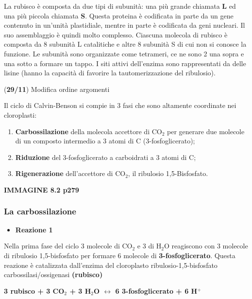 \documentclass[]{article}
\begin{document}
La rubisco è composta da due tipi di subunità: una più grande chiamata
\textbf{L} ed una più piccola chiamata \textbf{S}. Questa proteina è
codificata in parte da un gene contenuto in un'unità plastidiale, mentre
in parte è codificata da geni nucleari. Il suo assemblaggio è quindi
molto complesso. Ciascuna molecola di rubisco è composta da 8 subunità L
catalitiche e altre 8 subunità S di cui non si conosce la funzione. Le
subunità sono organizzate come tetrameri, ce ne sono 2 una sopra e una
sotto a formare un tappo. I siti attivi dell'enzima sono rappresentati
da delle lisine (hanno la capacità di favorire la tautomerizzazione del
ribulosio).

(\textbf{29/11}) Modifica ordine argomenti

Il ciclo di Calvin-Benson si compie in 3 fasi che sono altamente
coordinate nei cloroplasti:

\begin{enumerate}
\def\labelenumi{\arabic{enumi}.}
\itemsep1pt\parskip0pt
\item
  \textbf{Carbossilazione} della molecola accettore di CO$_2$ per
  generare due molecole di un composto intermedio a 3 atomi di C
  (3-fosfoglicerato);
\item
  \textbf{Riduzione} del 3-fosfoglicerato a carboidrati a 3 atomi di C;
\item
  \textbf{Rigenerazione} dell'accettore di CO$_2$, il ribulosio
  1,5-Bisfosfato.
\end{enumerate}

\textbf{IMMAGINE 8.2 p279}

\subsubsection{La carbossilazione}\label{la-carbossilazione}

\begin{itemize}
\itemsep1pt\parskip0pt
\item
  \textbf{Reazione 1}
\end{itemize}

Nella prima fase del ciclo 3 molecole di CO$_2$ e 3 di H$_2$O reagiscono
con 3 molecole di ribulosio 1,5-bisfosfato per formare 6 molecole di
\textbf{3-fosfoglicerato}. Questa reazione è catalizzata dall'enzima del
cloroplasto ribulosio-1,5-bisfosfato carbossilasi/ossigenasi
\textbf{(rubisco)}

\textbf{3 rubisco + 3 CO$_2$ + 3 H$_2$O $\leftrightarrow$ 6
3-fosfoglicerato + 6 H$^+$}
\end{document}
